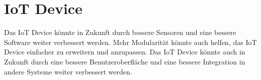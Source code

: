\section{IoT Device}
Das IoT Device könnte in Zukunft durch bessere Sensoren und eine bessere Software weiter verbessert werden.
Mehr Modularität könnte auch helfen, das IoT Device einfacher zu erweitern und anzupassen.
Das IoT Device könnte auch in Zukunft durch eine bessere Benutzeroberfläche und eine bessere Integration in andere Systeme weiter verbessert werden.
